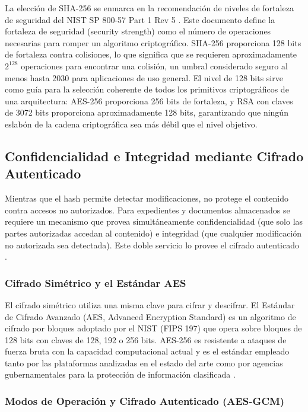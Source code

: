 La elección de SHA-256 se enmarca en la recomendación de niveles de fortaleza de seguridad del NIST SP 800-57 Part 1 Rev 5 \cite{barker2020}. Este documento define la fortaleza de seguridad (security strength) como el número de operaciones necesarias para romper un algoritmo criptográfico. SHA-256 proporciona 128 bits de fortaleza contra colisiones, lo que significa que se requieren aproximadamente $2^{128}$ operaciones para encontrar una colisión, un umbral considerado seguro al menos hasta 2030 para aplicaciones de uso general. El nivel de 128 bits sirve como guía para la selección coherente de todos los primitivos criptográficos de una arquitectura: AES-256 proporciona 256 bits de fortaleza, y RSA con claves de 3072 bits proporciona aproximadamente 128 bits, garantizando que ningún eslabón de la cadena criptográfica sea más débil que el nivel objetivo.

\subsection{Confidencialidad e Integridad mediante Cifrado Autenticado}\label{sec:cifrado-autenticado}

Mientras que el hash permite detectar modificaciones, no protege el contenido contra accesos no autorizados. Para expedientes y documentos almacenados se requiere un mecanismo que provea simultáneamente confidencialidad (que solo las partes autorizadas accedan al contenido) e integridad (que cualquier modificación no autorizada sea detectada). Este doble servicio lo provee el cifrado autenticado \cite{stallings2017}.

\subsubsection{Cifrado Simétrico y el Estándar AES}

El cifrado simétrico utiliza una misma clave para cifrar y descifrar. El Estándar de Cifrado Avanzado (AES, Advanced Encryption Standard) es un algoritmo de cifrado por bloques adoptado por el NIST (FIPS 197) \cite{nist2001fips197} que opera sobre bloques de 128 bits con claves de 128, 192 o 256 bits. AES-256 es resistente a ataques de fuerza bruta con la capacidad computacional actual y es el estándar empleado tanto por las plataformas analizadas en el estado del arte como por agencias gubernamentales para la protección de información clasificada \cite{paar2010}.

\subsubsection{Modos de Operación y Cifrado Autenticado (AES-GCM)}

